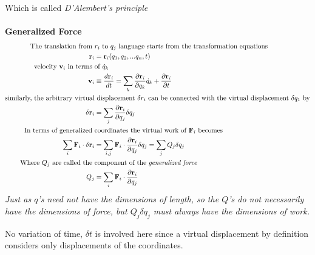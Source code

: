 Which is called \textit{D'Alembert's principle}\\\\
\textbf{Generalized Force}
\begin{align}
\text{The translation from }&\text{$r_i$ to $q_j$ language starts from the transformation equations}\notag\\
\textbf{r}_i&=\textbf{r}_i(q_1,q_2,...q_n,t)\label{EP-07}\\
\text{velocity $\textbf{v}_i$ in terms }&\text{of $\dot{q}_k$}\notag\\
\mathbf{v}_{i} &\equiv \frac{d \mathbf{r}_{i}}{d t}=\sum_{k} \frac{\partial \mathbf{r}_{i}}{\partial q_{k}} \dot{q}_{k}+\frac{\partial \mathbf{r}_{i}}{\partial t}\label{EP-08}\\
\text{similarly, the arbitrary virtual}&\text{ displacement $\delta r_i$ can be connected with the virtual displacement $\delta q_1$ by}\notag\\
\delta \mathbf{r}_{i}&=\sum_{j} \frac{\partial \mathbf{r}_{i}}{\partial q_{j}} \delta q_{j}\\
\text{In terms of generalized }&\text{coordinates the virtual work of $\textbf{F}_i$ becomes}\notag\\
\sum_{i} \mathbf{F}_{i} \cdot \delta \mathbf{r}_{i}&=\sum_{i, j} \mathbf{F}_{i} \cdot \frac{\partial \mathbf{r}_{i}}{\partial q_{j}} \delta q_{j}=\sum_{j} Q_{j} \delta q_{j}\label{EP-10}\\
\text{Where $Q_j$ are called the } &\text{component of the }\textit{generalized force}\notag \\
Q_{j}&=\sum_{i} \mathbf{F}_{i} \cdot \frac{\partial \mathbf{r}_{i}}{\partial q_{j}}\label{EP-11}
\end{align}
\textit{Just as $q$'s need not have the dimensions of length, so the $Q$'s do not necessarily have the dimensions of force, but $Q_j\delta q_j$ must always have the dimensions of work.}
\begin{note}
	No variation of time, $\delta t$ is involved here since a virtual displacement by definition considers only displacements of the coordinates.
\end{note}
